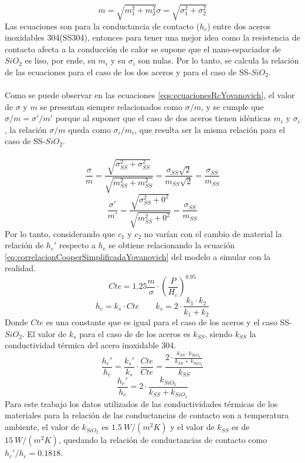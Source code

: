 \begin{subequations}
\begin{equation}
m=\sqrt{m_1^2+m_2^2}
\label{eq:mRMS}
\end{equation}
\begin{equation}
\sigma=\sqrt{\sigma_1^2+\sigma_2^2}
\label{eq:sigmaRMS}
\end{equation}
\label{eqs:RMS}
\end{subequations}
Las ecuaciones son para la conductancia de contacto ($h_c$) entre dos aceros inoxidables 304(SS304), entonces para tener una mejor idea como la resistencia de contacto afecta a la conducción de calor se supone que el nano-espaciador de $SiO_2$ es liso, por ende, su $m_i$ y su $\sigma_i$ son nulas. Por lo tanto, se calcula la relación de las ecuaciones para el caso de los dos aceros y para el caso de SS-$SiO_2$.\\\\
Como se puede observar en las ecuaciones \ref{eqs:ecuacionesRcYovanovich}, el valor de $\sigma$ y $m$ se presentan siempre relacionados como $\sigma / m$, y se cumple que $\sigma /m =\sigma ' / m'$ porque al suponer que el caso de dos aceros tienen idénticas $m_i$ y $\sigma_i$, la relación $\sigma / m$ queda como $\sigma_i / m_i$, que resulta ser la misma relación para el caso de SS-$SiO_2$.\\\\
\[ \frac{\sigma}{m}=\frac{\sqrt{\sigma_{SS}^2+\sigma_{SS}^2}}{\sqrt{m_{SS}^2+m_{SS}^2}}=\frac{\sigma_{SS}\sqrt{2}}{m_{SS}\sqrt{2}} =\frac{\sigma_{SS}}{m_{SS}}\]
\[ \frac{\sigma'}{m'}=\frac{\sqrt{\sigma_{SS}^2+0^2}}{\sqrt{m_{SS}^2+0^2}}=\frac{\sigma_{SS}}{m_{SS}} \]
Por lo tanto, considerando que $c_1$ y $c_2$ no varían con el cambio de material la relación de $h_c'$ respecto a $h_c$ se obtiene relacionando la ecuación \ref{eq:correlacionCooperSimplificadaYovanovich} del modelo a simular con la realidad.
\[Cte=1.25\frac{m}{\sigma}\cdot \left(\dfrac{P}{H_c}\right)^{0.95} \]
\[h_c=k_s\cdot Cte \qquad k_s=2\cdot \frac{k_1\cdot k_2}{k_1+k_2}\]
Donde $Cte$ es una constante que es igual para el caso de los aceros y el caso SS-$SiO_2$. El valor de $k_s$ para el caso de de los aceros es $k_{SS}$, siendo $k_{SS}$ la conductividad térmica del acero inoxidable 304. 
\[ \frac{h_c'}{h_c}=\frac{k_s'}{k_s}\cdot \frac{Cte}{Cte}=\frac{2 \cdot \frac{k_{SS}\cdot k_{SiO_2}}{k_{SS}+k_{SiO_2}}}{k_{SS}}\]
\begin{equation}
\frac{h_c'}{h_c}=2\cdot \frac{k_{SiO_2}}{k_{SS}+k_{SiO_2}}
\label{eq:relacion_conductividadesTermicas}
\end{equation}
Para este trabajo los datos utilizados de las conductividades térmicas de los materiales para la relación de las conductancias de contacto son a temperatura ambiente, el valor de $k_{SiO_2}$ es $1.5 \ W/\left( m^2 K\right)$ y el valor de $k_{SS}$ es de $15 \ W/\left( m^2 K\right)$, quedando la relación de conductancias de contacto como ${h_c'}/{h_c}=0.1818$.

